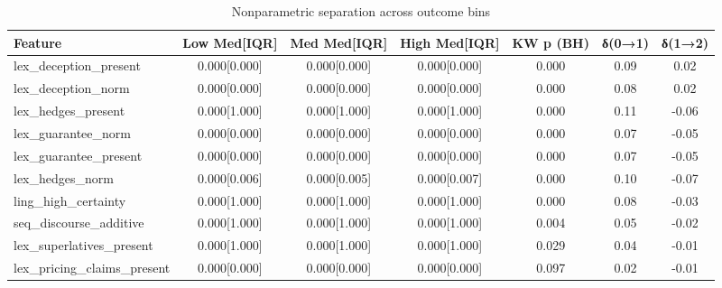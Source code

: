 \begin{table}[htbp]
\centering
\caption{Nonparametric separation across outcome bins}
\label{tab:per_bucket}
\begin{tabular}{lcccccc}
\toprule
Feature & Low Med[IQR] & Med Med[IQR] & High Med[IQR] & KW p (BH) & δ(0→1) & δ(1→2) \\
\midrule
lex\_deception\_present & 0.000[0.000] & 0.000[0.000] & 0.000[0.000] & 0.000 & 0.09 & 0.02 \\
lex\_deception\_norm & 0.000[0.000] & 0.000[0.000] & 0.000[0.000] & 0.000 & 0.08 & 0.02 \\
lex\_hedges\_present & 0.000[1.000] & 0.000[1.000] & 0.000[1.000] & 0.000 & 0.11 & -0.06 \\
lex\_guarantee\_norm & 0.000[0.000] & 0.000[0.000] & 0.000[0.000] & 0.000 & 0.07 & -0.05 \\
lex\_guarantee\_present & 0.000[0.000] & 0.000[0.000] & 0.000[0.000] & 0.000 & 0.07 & -0.05 \\
lex\_hedges\_norm & 0.000[0.006] & 0.000[0.005] & 0.000[0.007] & 0.000 & 0.10 & -0.07 \\
ling\_high\_certainty & 0.000[1.000] & 0.000[1.000] & 0.000[1.000] & 0.000 & 0.08 & -0.03 \\
seq\_discourse\_additive & 0.000[1.000] & 0.000[1.000] & 0.000[1.000] & 0.004 & 0.05 & -0.02 \\
lex\_superlatives\_present & 0.000[1.000] & 0.000[1.000] & 0.000[1.000] & 0.029 & 0.04 & -0.01 \\
lex\_pricing\_claims\_present & 0.000[0.000] & 0.000[0.000] & 0.000[0.000] & 0.097 & 0.02 & -0.01 \\
\bottomrule
\end{tabular}
\end{table}
